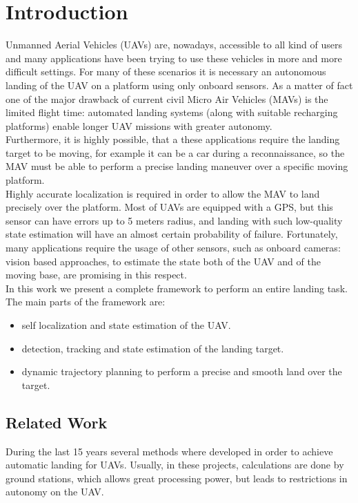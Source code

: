 \chapter{Introduction}\label{chap:introduction}
Unmanned Aerial Vehicles (UAVs) are, nowadays, accessible to all kind of users and many applications have been trying to use these vehicles in more and more difficult settings. For many of these scenarios it is necessary an autonomous landing of the UAV on a platform using only onboard sensors. As a matter of fact one of the major drawback of current civil Micro Air Vehicles (MAVs) is the limited flight time: automated landing systems (along with suitable recharging platforms) enable longer UAV missions with greater autonomy.\\
Furthermore, it is highly possible, that a these applications require the landing target to be moving, for example it can be a car during a reconnaissance, so the MAV must be able to perform a precise landing maneuver over a specific moving platform.\\

Highly accurate localization is required in order to allow the MAV to land precisely over the platform. Most of UAVs are equipped with a GPS, but this sensor can have errors up to 5 meters radius, and landing with such low-quality state estimation will have an almost certain probability of failure. Fortunately, many applications require the usage of other sensors, such as onboard cameras: vision based approaches, to estimate the state both of the UAV and of the moving base, are promising in this respect.\\

In this work we present a complete framework to perform an entire landing task. The main parts of the framework are:
\begin{itemize}
\item self localization and state estimation of the UAV.
\item detection, tracking and state estimation of the landing target.
\item dynamic trajectory planning to perform a precise and smooth land over the target.
\end{itemize}

\section{Related Work}\label{sec:related_work}

During the last 15 years several methods where developed in order to achieve automatic landing for UAVs.
Usually, in these projects, calculations are done by ground stations, which allows great processing power, but leads to restrictions in autonomy on the UAV. \\

